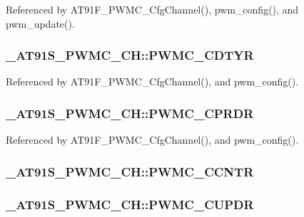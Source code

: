 Referenced by AT91F\_\-PWMC\_\-CfgChannel(), pwm\_\-config(), and pwm\_\-update().\hypertarget{struct__AT91S__PWMC__CH_26e04d9e84c8a4e470e63ba4166ef707}{
\subsubsection{ {\bf \_\-AT91S\_\-PWMC\_\-CH::PWMC\_\-CDTYR}}}
\label{struct__AT91S__PWMC__CH_26e04d9e84c8a4e470e63ba4166ef707}




Referenced by AT91F\_\-PWMC\_\-CfgChannel(), and pwm\_\-config().\hypertarget{struct__AT91S__PWMC__CH_9bd363b91bbf1fad7c2205b403f4bda0}{
\subsubsection{ {\bf \_\-AT91S\_\-PWMC\_\-CH::PWMC\_\-CPRDR}}}
\label{struct__AT91S__PWMC__CH_9bd363b91bbf1fad7c2205b403f4bda0}




Referenced by AT91F\_\-PWMC\_\-CfgChannel(), and pwm\_\-config().\hypertarget{struct__AT91S__PWMC__CH_e1a9fb05c89fe1a67b8a519ac04cff88}{
\subsubsection{ {\bf \_\-AT91S\_\-PWMC\_\-CH::PWMC\_\-CCNTR}}}
\label{struct__AT91S__PWMC__CH_e1a9fb05c89fe1a67b8a519ac04cff88}


\hypertarget{struct__AT91S__PWMC__CH_bb4f81af917724b30274a8c08918ea32}{
\subsubsection{ {\bf \_\-AT91S\_\-PWMC\_\-CH::PWMC\_\-CUPDR}}}
\label{struct__AT91S__PWMC__CH_bb4f81af917724b30274a8c08918ea32}




